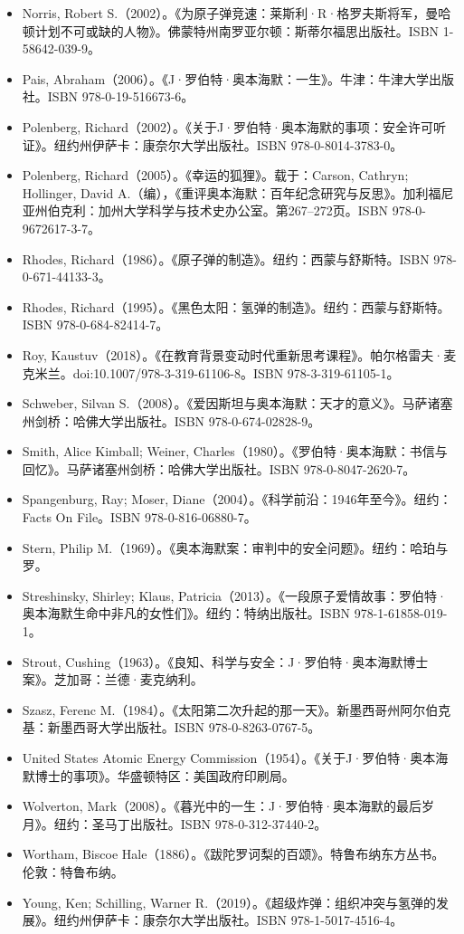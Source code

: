 \begin{itemize}
\item Norris, Robert S.（2002）。《为原子弹竞速：莱斯利·R·格罗夫斯将军，曼哈顿计划不可或缺的人物》。佛蒙特州南罗亚尔顿：斯蒂尔福思出版社。ISBN 1-58642-039-9。
\item Pais, Abraham（2006）。《J·罗伯特·奥本海默：一生》。牛津：牛津大学出版社。ISBN 978-0-19-516673-6。
\item Polenberg, Richard（2002）。《关于J·罗伯特·奥本海默的事项：安全许可听证》。纽约州伊萨卡：康奈尔大学出版社。ISBN 978-0-8014-3783-0。
\item Polenberg, Richard（2005）。《幸运的狐狸》。载于：Carson, Cathryn; Hollinger, David A.（编），《重评奥本海默：百年纪念研究与反思》。加利福尼亚州伯克利：加州大学科学与技术史办公室。第267–272页。ISBN 978-0-9672617-3-7。
\item Rhodes, Richard（1986）。《原子弹的制造》。纽约：西蒙与舒斯特。ISBN 978-0-671-44133-3。
\item Rhodes, Richard（1995）。《黑色太阳：氢弹的制造》。纽约：西蒙与舒斯特。ISBN 978-0-684-82414-7。
\item Roy, Kaustuv（2018）。《在教育背景变动时代重新思考课程》。帕尔格雷夫·麦克米兰。doi:10.1007/978-3-319-61106-8。ISBN 978-3-319-61105-1。
\item Schweber, Silvan S.（2008）。《爱因斯坦与奥本海默：天才的意义》。马萨诸塞州剑桥：哈佛大学出版社。ISBN 978-0-674-02828-9。
\item Smith, Alice Kimball; Weiner, Charles（1980）。《罗伯特·奥本海默：书信与回忆》。马萨诸塞州剑桥：哈佛大学出版社。ISBN 978-0-8047-2620-7。
\item Spangenburg, Ray; Moser, Diane（2004）。《科学前沿：1946年至今》。纽约：Facts On File。ISBN 978-0-816-06880-7。
\item Stern, Philip M.（1969）。《奥本海默案：审判中的安全问题》。纽约：哈珀与罗。
\item Streshinsky, Shirley; Klaus, Patricia（2013）。《一段原子爱情故事：罗伯特·奥本海默生命中非凡的女性们》。纽约：特纳出版社。ISBN 978-1-61858-019-1。
\item Strout, Cushing（1963）。《良知、科学与安全：J·罗伯特·奥本海默博士案》。芝加哥：兰德·麦克纳利。
\item Szasz, Ferenc M.（1984）。《太阳第二次升起的那一天》。新墨西哥州阿尔伯克基：新墨西哥大学出版社。ISBN 978-0-8263-0767-5。
\item United States Atomic Energy Commission（1954）。《关于J·罗伯特·奥本海默博士的事项》。华盛顿特区：美国政府印刷局。
\item Wolverton, Mark（2008）。《暮光中的一生：J·罗伯特·奥本海默的最后岁月》。纽约：圣马丁出版社。ISBN 978-0-312-37440-2。
\item Wortham, Biscoe Hale（1886）。《跋陀罗诃梨的百颂》。特鲁布纳东方丛书。伦敦：特鲁布纳。
\item Young, Ken; Schilling, Warner R.（2019）。《超级炸弹：组织冲突与氢弹的发展》。纽约州伊萨卡：康奈尔大学出版社。ISBN 978-1-5017-4516-4。
\end{itemize}
